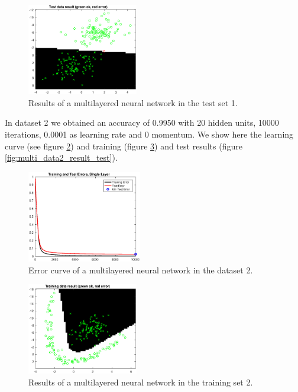 \documentclass{article}
\begin{document}
\begin{figure}[H]
\centering
\includegraphics[height=4cm]{images/multi_data1_result_test}
\caption{Results of a multilayered neural network in the test set 1.}
\label{fig:multi_data1_result_test}
\end{figure}


In dataset 2 we obtained an accuracy of 0.9950 with 20 hidden units, 10000 iterations, 0.0001 as learning rate and 0 momentum. We show here the learning curve (see figure \ref{fig:multi_data2_error}) and training (figure \ref{fig:multi_data2_result_train}) and test results (figure \ref{fig:multi_data2_result_test}).

\begin{figure}[H]
\centering
\includegraphics[height=4cm]{images/multi_data2_error}
\caption{Error curve of a multilayered neural network in the dataset 2.}
\label{fig:multi_data2_error}
\end{figure}

\begin{figure}[H]
\centering
\includegraphics[height=4cm]{images/multi_data2_result_train}
\caption{Results of a multilayered neural network in the training set 2.}
\label{fig:multi_data2_result_train}
\end{figure}
\end{document}
